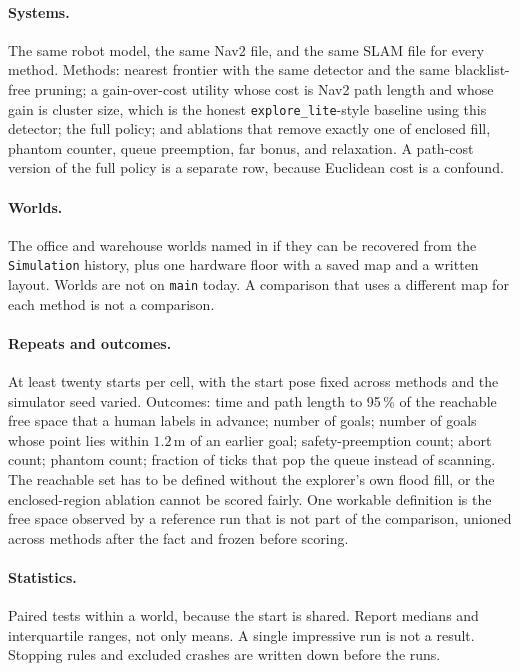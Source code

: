 \documentclass[11pt]{article}
\begin{document}
\paragraph{Systems.}
The same robot model, the same Nav2 file, and the same SLAM file for every method. Methods: nearest frontier with the same detector and the same blacklist-free pruning; a gain-over-cost utility whose cost is Nav2 path length and whose gain is cluster size, which is the honest \texttt{explore\_lite}-style baseline using this detector; the full policy; and ablations that remove exactly one of enclosed fill, phantom counter, queue preemption, far bonus, and relaxation. A path-cost version of the full policy is a separate row, because Euclidean cost is a confound.

\paragraph{Worlds.}
The office and warehouse worlds named in  if they can be recovered from the \texttt{Simulation} history, plus one hardware floor with a saved map and a written layout. Worlds are not on \texttt{main} today. A comparison that uses a different map for each method is not a comparison.

\paragraph{Repeats and outcomes.}
At least twenty starts per cell, with the start pose fixed across methods and the simulator seed varied. Outcomes: time and path length to 95\,\% of the reachable free space that a human labels in advance; number of goals; number of goals whose point lies within $1.2$\,m of an earlier goal; safety-preemption count; abort count; phantom count; fraction of ticks that pop the queue instead of scanning. The reachable set has to be defined without the explorer's own flood fill, or the enclosed-region ablation cannot be scored fairly. One workable definition is the free space observed by a reference run that is not part of the comparison, unioned across methods after the fact and frozen before scoring.

\paragraph{Statistics.}
Paired tests within a world, because the start is shared. Report medians and interquartile ranges, not only means. A single impressive run is not a result. Stopping rules and excluded crashes are written down before the runs.
\end{document}
